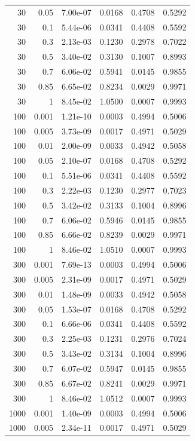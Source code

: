 {\begin{longtable}{rrrrrr}
30 & 0.05 & 7.00e-07 & 0.0168 & 0.4708 & 0.5292 \\
30 & 0.1 & 5.44e-06 & 0.0341 & 0.4408 & 0.5592 \\
30 & 0.3 & 2.13e-03 & 0.1230 & 0.2978 & 0.7022 \\
30 & 0.5 & 3.40e-02 & 0.3130 & 0.1007 & 0.8993 \\
30 & 0.7 & 6.06e-02 & 0.5941 & 0.0145 & 0.9855 \\
30 & 0.85 & 6.65e-02 & 0.8234 & 0.0029 & 0.9971 \\
30 & 1 & 8.45e-02 & 1.0500 & 0.0007 & 0.9993 \\
100 & 0.001 & 1.21e-10 & 0.0003 & 0.4994 & 0.5006 \\
100 & 0.005 & 3.73e-09 & 0.0017 & 0.4971 & 0.5029 \\
100 & 0.01 & 2.00e-09 & 0.0033 & 0.4942 & 0.5058 \\
100 & 0.05 & 2.10e-07 & 0.0168 & 0.4708 & 0.5292 \\
100 & 0.1 & 5.51e-06 & 0.0341 & 0.4408 & 0.5592 \\
100 & 0.3 & 2.22e-03 & 0.1230 & 0.2977 & 0.7023 \\
100 & 0.5 & 3.42e-02 & 0.3133 & 0.1004 & 0.8996 \\
100 & 0.7 & 6.06e-02 & 0.5946 & 0.0145 & 0.9855 \\
100 & 0.85 & 6.66e-02 & 0.8239 & 0.0029 & 0.9971 \\
100 & 1 & 8.46e-02 & 1.0510 & 0.0007 & 0.9993 \\
300 & 0.001 & 7.69e-13 & 0.0003 & 0.4994 & 0.5006 \\
300 & 0.005 & 2.31e-09 & 0.0017 & 0.4971 & 0.5029 \\
300 & 0.01 & 1.48e-09 & 0.0033 & 0.4942 & 0.5058 \\
300 & 0.05 & 1.53e-07 & 0.0168 & 0.4708 & 0.5292 \\
300 & 0.1 & 6.66e-06 & 0.0341 & 0.4408 & 0.5592 \\
300 & 0.3 & 2.25e-03 & 0.1231 & 0.2976 & 0.7024 \\
300 & 0.5 & 3.43e-02 & 0.3134 & 0.1004 & 0.8996 \\
300 & 0.7 & 6.07e-02 & 0.5947 & 0.0145 & 0.9855 \\
300 & 0.85 & 6.67e-02 & 0.8241 & 0.0029 & 0.9971 \\
300 & 1 & 8.46e-02 & 1.0512 & 0.0007 & 0.9993 \\
1000 & 0.001 & 1.40e-09 & 0.0003 & 0.4994 & 0.5006 \\
1000 & 0.005 & 2.34e-11 & 0.0017 & 0.4971 & 0.5029 \\

\end{longtable}}
